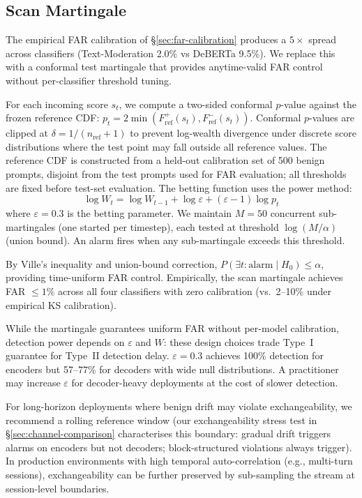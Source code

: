
\subsection{Scan Martingale}
\label{sec:martingale}

The empirical FAR calibration of \S\ref{sec:far-calibration} produces a $5\times$ spread across classifiers (Text-Moderation 2.0\% vs DeBERTa 9.5\%). We replace this with a conformal test martingale that provides anytime-valid FAR control without per-classifier threshold tuning.

For each incoming score $s_t$, we compute a two-sided conformal $p$-value against the frozen reference CDF: $p_t = 2 \min(F_{\text{ref}}^+(s_t), F_{\text{ref}}^-(s_t))$. Conformal $p$-values are clipped at $\delta = 1/(n_{\text{ref}}+1)$ to prevent log-wealth divergence under discrete score distributions where the test point may fall outside all reference values. The reference CDF is constructed from a held-out calibration set of 500 benign prompts, disjoint from the test prompts used for FAR evaluation; all thresholds are fixed before test-set evaluation. The betting function uses the power method:
\begin{equation}
\log W_t = \log W_{t-1} + \log \varepsilon + (\varepsilon - 1) \log p_t
\end{equation}
where $\varepsilon = 0.3$ is the betting parameter. We maintain $M = 50$ concurrent sub-martingales (one started per timestep), each tested at threshold $\log(M/\alpha)$ (union bound). An alarm fires when any sub-martingale exceeds this threshold.

By Ville's inequality and union-bound correction, $P(\exists t: \text{alarm} \mid H_0) \leq \alpha$, providing time-uniform FAR control. Empirically, the scan martingale achieves FAR $\leq 1\%$ across all four classifiers with zero calibration (vs.\ 2--10\% under empirical KS calibration).

While the martingale guarantees uniform FAR without per-model calibration, detection power depends on $\varepsilon$ and $W$: these design choices trade Type~I guarantee for Type~II detection delay. $\varepsilon = 0.3$ achieves 100\% detection for encoders but 57--77\% for decoders with wide null distributions. A practitioner may increase $\varepsilon$ for decoder-heavy deployments at the cost of slower detection.

For long-horizon deployments where benign drift may violate exchangeability, we recommend a rolling reference window (our exchangeability stress test in \S\ref{sec:channel-comparison} characterises this boundary: gradual drift triggers alarms on encoders but not decoders; block-structured violations always trigger). In production environments with high temporal auto-correlation (e.g., multi-turn sessions), exchangeability can be further preserved by sub-sampling the stream at session-level boundaries.


